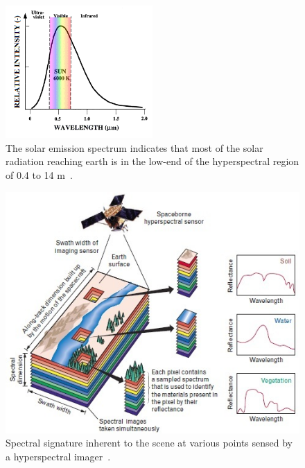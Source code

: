 \begin{figure}[htb]		%
\centering
\includegraphics[width=0.5\textwidth]{images/chap1/solaremissionspectrum}
\caption{The solar emission spectrum indicates that most of the solar radiation reaching earth is in the low-end of the hyperspectral region of 0.4 to 14 \textmu m~\cite{JunkScience}.}
\label{fig:SolarEmissionSpectrum}
\end{figure}


\begin{figure}[htb]		%
\centering
\includegraphics[width=1\textwidth]{images/chap1/ReflectanceSpectrum}
\caption{Spectral signature inherent to the scene at various points sensed by a hyperspectral imager~\cite{Shaw}.}
\label{fig:Reflectance}
\end{figure}

